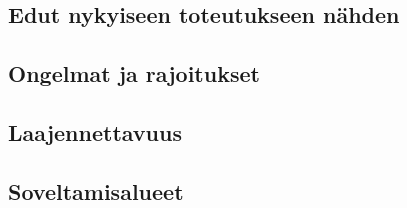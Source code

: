 

\subsection{Edut nykyiseen toteutukseen nähden}


\subsection{Ongelmat ja rajoitukset}


\subsection{Laajennettavuus}


\subsection{Soveltamisalueet}

